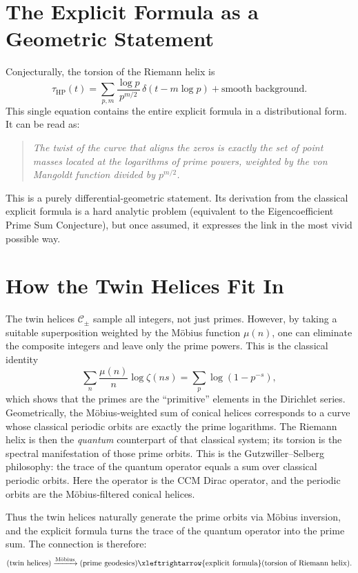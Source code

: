 \documentclass[12pt,a4paper]{article}
\begin{document}
\section{The Explicit Formula as a Geometric Statement}
Conjecturally, the torsion of the Riemann helix is
\[
\tau_{\mathrm{HP}}(t) = \sum_{p,m}\frac{\log p}{p^{m/2}}\,\delta(t-m\log p) + \text{smooth background}.
\]
This single equation contains the entire explicit formula in a distributional form.  It can be read as:
\begin{quote}
\textit{The twist of the curve that aligns the zeros is exactly the set of point masses located at the logarithms of prime powers, weighted by the von Mangoldt function divided by $p^{m/2}$.}
\end{quote}
This is a purely differential‑geometric statement.  Its derivation from the classical explicit formula is a hard analytic problem (equivalent to the Eigencoefficient Prime Sum Conjecture), but once assumed, it expresses the link in the most vivid possible way.

\section{How the Twin Helices Fit In}
The twin helices $\mathcal{C}_\pm$ sample all integers, not just primes.  However, by taking a suitable superposition weighted by the M\"obius function $\mu(n)$, one can eliminate the composite integers and leave only the prime powers.  This is the classical identity
\[
\sum_{n} \frac{\mu(n)}{n}\log \zeta(ns) = \sum_{p} \log(1-p^{-s}),
\]
which shows that the primes are the ``primitive'' elements in the Dirichlet series.  Geometrically, the M\"obius‑weighted sum of conical helices corresponds to a curve whose classical periodic orbits are exactly the prime logarithms.  The Riemann helix is then the \emph{quantum} counterpart of that classical system; its torsion is the spectral manifestation of those prime orbits.  This is the Gutzwiller–Selberg philosophy: the trace of the quantum operator equals a sum over classical periodic orbits.  Here the operator is the CCM Dirac operator, and the periodic orbits are the M\"obius‑filtered conical helices.

Thus the twin helices naturally generate the prime orbits via M\"obius inversion, and the explicit formula turns the trace of the quantum operator into the prime sum.  The connection is therefore:
\[
\text{(twin helices)} \xrightarrow{\text{M\"obius}} \text{(prime geodesics)} \xleftrightarrow{\text{explicit formula}} \text{(torsion of Riemann helix)}.
\]
\end{document}
